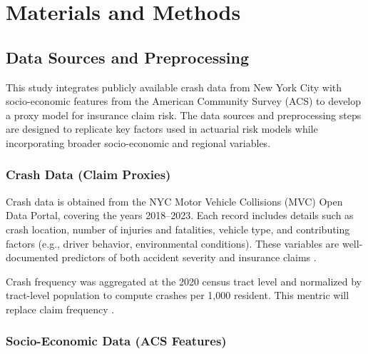 \documentclass[
  number,
  review,
  3p]{elsarticle}
\begin{document}
\section{Materials and Methods}\label{materials-and-methods}

\subsection{\texorpdfstring{\textbf{Data Sources and
Preprocessing}}{Data Sources and Preprocessing}}\label{data-sources-and-preprocessing}

This study integrates publicly available crash data from New York City
with socio-economic features from the American Community Survey (ACS) to
develop a proxy model for insurance claim risk. The data sources and
preprocessing steps are designed to replicate key factors used in
actuarial risk models while incorporating broader socio-economic and
regional variables.

\subsubsection{Crash Data (Claim
Proxies)}\label{crash-data-claim-proxies}

Crash data is obtained from the NYC Motor Vehicle Collisions (MVC) Open
Data Portal, covering the years 2018--2023. Each record includes details
such as crash location, number of injuries and fatalities, vehicle type,
and contributing factors (e.g., driver behavior, environmental
conditions). These variables are well-documented predictors of both
accident severity and insurance claims \citep{adeniyi, dong}.

Crash frequency was aggregated at the 2020 census tract level and
normalized by tract-level population to compute crashes per 1,000
resident. This mentric will replace claim frequency \citep{brubacher}.

\subsubsection{Socio-Economic Data (ACS
Features)}\label{socio-economic-data-acs-features}
\end{document}
